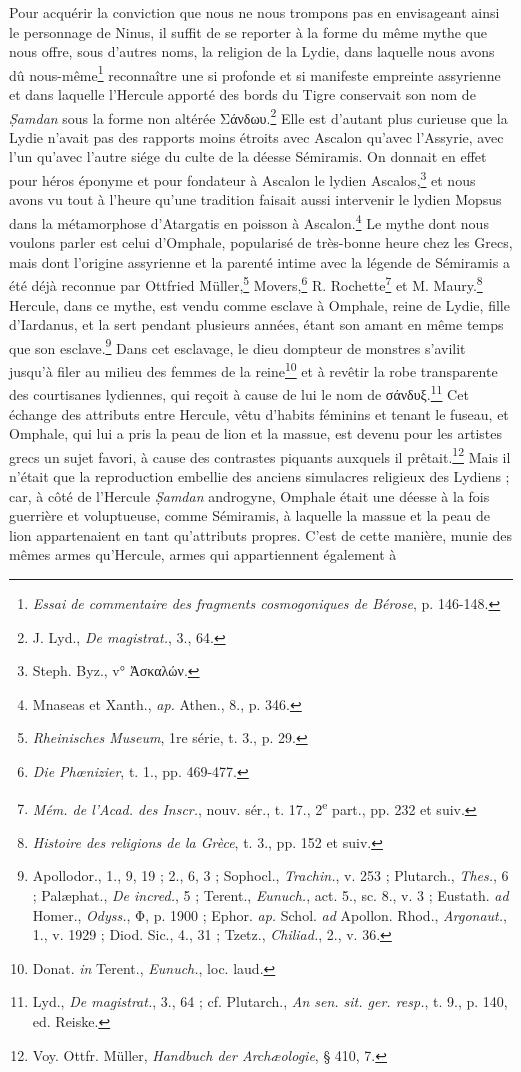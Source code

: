 \documentclass[a4paper, 11pt, oneside, landscape]{article}
\begin{document}
Pour acquérir la conviction que nous ne nous trompons pas en envisageant ainsi le personnage de Ninus, il suffit de se reporter à la forme du même mythe que nous offre, sous d'autres noms, la religion de la Lydie, dans laquelle nous avons dû nous-même\footnote{\emph{Essai de commentaire des fragments cosmogoniques de Bérose}, p. 146-148.} reconnaître une si profonde et si manifeste empreinte assyrienne et dans laquelle l'Hercule apporté des bords du Tigre conservait son nom de \emph{\d{S}amdan} sous la forme non altérée Σάνδωυ.\footnote{J. Lyd., \emph{De magistrat.}, 3., 64.} Elle est d'autant plus curieuse que la Lydie n'avait pas des rapports moins étroits avec Ascalon qu'avec l'Assyrie, avec l'un qu'avec l'autre siége du culte de la déesse Sémiramis. On donnait en effet pour héros éponyme et pour fondateur à Ascalon le lydien Ascalos,\footnote{Steph. Byz., v° Ἀσκαλών.} et nous avons vu tout à l'heure qu'une tradition faisait aussi intervenir le lydien Mopsus dans la métamorphose d'Atargatis en poisson à Ascalon.\footnote{Mnaseas et Xanth., \emph{ap.} Athen., 8., p. 346.} Le mythe dont nous voulons parler est celui d'Omphale, popularisé de très-bonne heure chez les Grecs, mais dont l'origine assyrienne et la parenté intime avec la légende de Sémiramis a été déjà reconnue par Ottfried Müller,\footnote{\emph{Rheinisches Museum}, 1re série, t. 3., p. 29.} Movers,\footnote{\emph{Die Phœnizier}, t. 1., pp. 469-477.} R. Rochette\footnote{\emph{Mém. de l'Acad. des Inscr.}, nouv. sér., t. 17., 2\textsuperscript{e} part., pp. 232 et suiv.} et M. Maury.\footnote{\emph{Histoire des religions de la Grèce}, t. 3., pp. 152 et suiv.} Hercule, dans ce mythe, est vendu comme esclave à Omphale, reine de Lydie, fille d'Iardanus, et la sert pendant plusieurs années, étant son amant en même temps que son esclave.\footnote{Apollodor., 1., 9, 19 ; 2., 6, 3 ; Sophocl., \emph{Trachin.}, v. 253 ; Plutarch., \emph{Thes.}, 6 ; Palæphat., \emph{De incred.}, 5 ; Terent., \emph{Eunuch.}, act. 5., sc. 8., v. 3 ; Eustath. \emph{ad} Homer., \emph{Odyss.}, Φ, p. 1900 ; Ephor. \emph{ap.} Schol. \emph{ad} Apollon. Rhod., \emph{Argonaut.}, 1., v. 1929 ; Diod. Sic., 4., 31 ; Tzetz., \emph{Chiliad.}, 2., v. 36.} Dans cet esclavage, le dieu dompteur de monstres s'avilit jusqu'à filer au milieu des femmes de la reine\footnote{Donat. \emph{in} Terent., \emph{Eunuch.}, loc. laud.} et à revêtir la robe transparente des courtisanes lydiennes, qui reçoit à cause de lui le nom de σάνδυξ.\footnote{Lyd., \emph{De magistrat.}, 3., 64 ; cf. Plutarch., \emph{An sen. sit. ger. resp.}, t. 9., p. 140, ed. Reiske.} Cet échange des attributs entre Hercule, vêtu d'habits féminins et tenant le fuseau, et Omphale, qui lui a pris la peau de lion et la massue, est devenu pour les artistes grecs un sujet favori, à cause des contrastes piquants auxquels il prêtait.\footnote{Voy. Ottfr. Müller, \emph{Handbuch der Archæologie}, § 410, 7.} Mais il n'était que la reproduction embellie des anciens simulacres religieux des Lydiens ; car, à côté de l'Hercule \emph{\d{S}amdan} androgyne, Omphale était une déesse à la fois guerrière et voluptueuse, comme Sémiramis, à laquelle la massue et la peau de lion appartenaient en tant qu'attributs propres. C'est de cette manière, munie des mêmes armes qu'Hercule, armes qui appartiennent également à 
\end{document}
